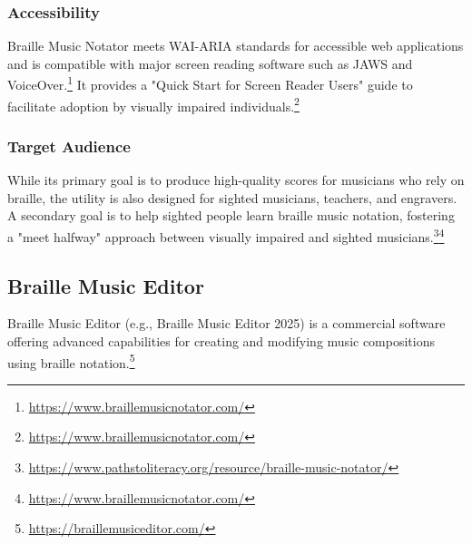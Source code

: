 \subsubsection{Accessibility}
Braille Music Notator meets WAI-ARIA standards for accessible web applications and is compatible with major screen reading software such as JAWS and VoiceOver.\footnote{\url{https://www.braillemusicnotator.com/}} It provides a "Quick Start for Screen Reader Users" guide to facilitate adoption by visually impaired individuals.\footnote{\url{https://www.braillemusicnotator.com/}}

\subsubsection{Target Audience}
While its primary goal is to produce high-quality scores for musicians who rely on braille, the utility is also designed for sighted musicians, teachers, and engravers. A secondary goal is to help sighted people learn braille music notation, fostering a "meet halfway" approach between visually impaired and sighted musicians.\footnote{\url{https://www.pathstoliteracy.org/resource/braille-music-notator/}}\footnote{\url{https://www.braillemusicnotator.com/}}

\subsection{Braille Music Editor}
Braille Music Editor (e.g., Braille Music Editor 2025) is a commercial software offering advanced capabilities for creating and modifying music compositions using braille notation.\footnote{\url{https://braillemusiceditor.com/}}

